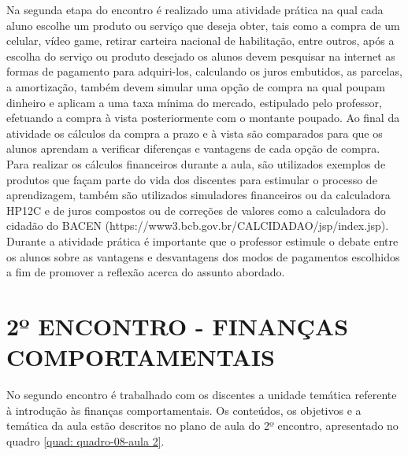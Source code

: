 Na segunda etapa do encontro é realizado uma atividade prática na qual cada aluno escolhe um produto ou serviço que deseja obter, tais como a compra de um celular, vídeo game, retirar carteira nacional de habilitação, entre outros, após a escolha do serviço ou produto desejado os alunos devem pesquisar na internet as formas de pagamento para adquiri-los, calculando os juros embutidos, as parcelas, a amortização, também devem simular uma opção de compra na qual poupam dinheiro e aplicam a uma taxa mínima do mercado, estipulado pelo professor, efetuando a compra à vista posteriormente com o montante poupado. Ao final da atividade os cálculos da compra a prazo e à vista são comparados para que os alunos aprendam a verificar diferenças e vantagens de cada opção de compra. Para realizar os cálculos financeiros durante a aula, são utilizados exemplos de produtos que façam parte do vida dos discentes para estimular o processo de aprendizagem, também são utilizados simuladores financeiros ou da calculadora HP12C e de juros compostos ou de correções de valores como a calculadora do cidadão do BACEN (https://www3.bcb.gov.br/CALCIDADAO/jsp/index.jsp). Durante a atividade prática é importante que o professor estimule o debate entre os alunos sobre as vantagens e desvantagens dos modos de pagamentos escolhidos a fim de promover a reflexão acerca do assunto abordado.

\section{2º ENCONTRO - FINANÇAS COMPORTAMENTAIS}
No segundo encontro é trabalhado com os discentes a unidade temática referente à introdução às finanças comportamentais. Os conteúdos, os objetivos e a temática da aula estão descritos no plano de aula do 2º encontro, apresentado no quadro \ref{quad: quadro-08-aula 2}.

